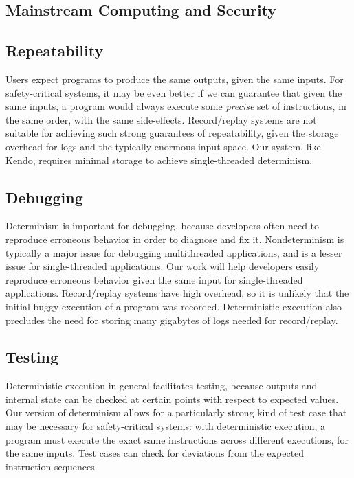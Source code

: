 \subsection{Mainstream Computing and Security}


\subsection{Repeatability}
Users expect programs to produce the same outputs, given the same
inputs. For safety-critical systems, it may
be even better if we can guarantee that given the same inputs,
a program would always execute some {\em precise} 
set of instructions, in the same order, with
the same side-effects. Record/replay systems are not suitable for 
achieving such strong guarantees of repeatability, given the storage
overhead for logs and the typically enormous input space. 
Our system, like Kendo, requires minimal storage to achieve
single-threaded determinism. 

\subsection{Debugging}
Determinism is important for debugging, because developers
often need to reproduce erroneous behavior in
order to diagnose and fix it. Nondeterminism is typically
a major issue for debugging multithreaded applications,
and is a lesser issue for single-threaded
applications. Our work will help developers
easily reproduce erroneous behavior given
the same input for single-threaded applications. 
Record/replay systems have high overhead, so it is unlikely
that the initial buggy execution of a program was recorded.
Deterministic execution also precludes the need for storing
many gigabytes of logs needed for record/replay.

\subsection{Testing}
Deterministic execution in general facilitates testing,
because outputs and internal state can be checked at 
certain points with respect to expected values. Our version
of determinism allows for a particularly strong kind
of test case that may be necessary for safety-critical 
systems: with deterministic execution, a program 
must execute the exact same instructions 
across different executions, for the same inputs.
Test cases can check for deviations from 
the expected instruction sequences.

